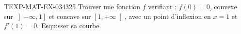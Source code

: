 \begin{exercice}{TEXP-MAT-EX-034}{3}{25}
Trouver une fonction $f$ verifiant : $f(0)=0$, convexe sur $\left]-\infty, 1\right]$ et concave sur $\left[1, +\infty\right[$, avec un point d'inflexion en $x=1$ et $f'(1)=0$. Esquisser sa courbe.

\end{exercice}
